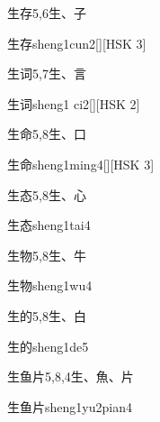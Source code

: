 \begin{entry}{生存}{5,6}{⽣、⼦}
  \begin{phonetics}{生存}{sheng1cun2}[][HSK 3]
  \end{phonetics}
\end{entry}

\begin{entry}{生词}{5,7}{⽣、⾔}
  \begin{phonetics}{生词}{sheng1 ci2}[][HSK 2]
  \end{phonetics}
\end{entry}

\begin{entry}{生命}{5,8}{⽣、⼝}
  \begin{phonetics}{生命}{sheng1ming4}[][HSK 3]
  \end{phonetics}
\end{entry}

\begin{entry}{生态}{5,8}{⽣、⼼}
  \begin{phonetics}{生态}{sheng1tai4}
  \end{phonetics}
\end{entry}

\begin{entry}{生物}{5,8}{⽣、⽜}
  \begin{phonetics}{生物}{sheng1wu4}
  \end{phonetics}
\end{entry}

\begin{entry}{生的}{5,8}{⽣、⽩}
  \begin{phonetics}{生的}{sheng1de5}
  \end{phonetics}
\end{entry}

\begin{entry}{生鱼片}{5,8,4}{⽣、⿂、⽚}
  \begin{phonetics}{生鱼片}{sheng1yu2pian4}
  \end{phonetics}
\end{entry}

